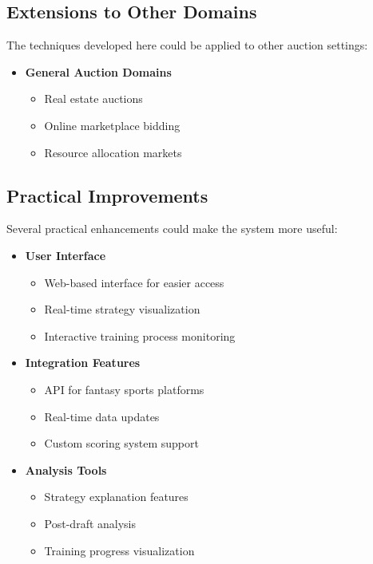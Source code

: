 \documentclass[11pt]{article}
\begin{document}
\subsection{Extensions to Other Domains}
The techniques developed here could be applied to other auction settings:

\begin{itemize}
    
    \item \textbf{General Auction Domains}
    \begin{itemize}
        \item Real estate auctions
        \item Online marketplace bidding
        \item Resource allocation markets
    \end{itemize}
\end{itemize}

\subsection{Practical Improvements}
Several practical enhancements could make the system more useful:

\begin{itemize}
    \item \textbf{User Interface}
    \begin{itemize}
        \item Web-based interface for easier access
        \item Real-time strategy visualization
        \item Interactive training process monitoring
    \end{itemize}
    
    \item \textbf{Integration Features}
    \begin{itemize}
        \item API for fantasy sports platforms
        \item Real-time data updates
        \item Custom scoring system support
    \end{itemize}
    
    \item \textbf{Analysis Tools}
    \begin{itemize}
        \item Strategy explanation features
        \item Post-draft analysis
        \item Training progress visualization
    \end{itemize}
\end{itemize}
\end{document}
